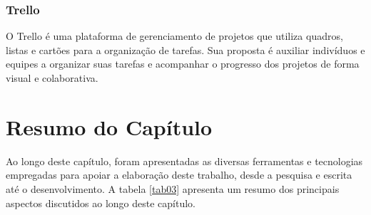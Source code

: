 \subsubsection{Trello}
\label{sec:Trello}
O Trello \cite{trello} é uma plataforma de gerenciamento de projetos que utiliza quadros, listas e cartões para a organização de tarefas. Sua proposta é auxiliar indivíduos e equipes a organizar suas tarefas e acompanhar o progresso 
dos projetos de forma visual e colaborativa.

\section{Resumo do Capítulo}
\label{sec:Resumo do Capítulo 2}
Ao longo deste capítulo, foram apresentadas as diversas ferramentas e tecnologias empregadas para apoiar a elaboração deste trabalho, desde a pesquisa e escrita até o desenvolvimento. 
A tabela \ref{tab03} apresenta um resumo dos principais aspectos discutidos ao longo deste capítulo.

